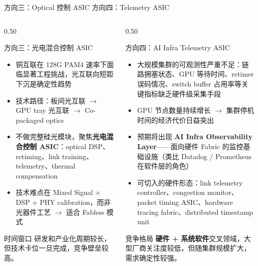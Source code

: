 \documentclass[aspectratio=169, 8pt, UTF8]{ctexbeamer}
\begin{document}
\begin{frame}{方向三：Optical 控制 ASIC \quad 方向四：Telemetry ASIC}
  \begin{columns}[T]
    \begin{column}{0.50\textwidth}
      \begin{block}{方向三：光电混合控制 ASIC}
        \begin{itemize}
          \item 铜互联在 128G PAM4 速率下面临显著工程挑战，光互联向短距下沉是确定性趋势
          \item 技术路径：板间光互联 $\to$ GPU tray 光互联 $\to$ Co-packaged optics
          \item 不做完整硅光模块，聚焦\textbf{光电混合控制 ASIC}：optical DSP、retiming、link training、telemetry、thermal compensation
          \item 技术难点在 Mixed Signal + DSP + PHY calibration，而非光器件工艺 $\to$ 适合 Fabless 模式
        \end{itemize}
      \end{block}
      \begin{alertblock}{时间窗口}
        研发和产业化周期较长，但技术卡位一旦完成，竞争壁垒较高。
      \end{alertblock}
    \end{column}
    \begin{column}{0.50\textwidth}
      \begin{block}{方向四：AI Infra Telemetry ASIC}
        \begin{itemize}
          \item 大规模集群的可观测性严重不足：链路拥塞状态、GPU 等待时间、retimer 误码情况、switch buffer 占用率等关键指标缺乏硬件级采集手段
          \item GPU 节点数量持续增长 $\to$ 集群停机时间的经济代价日益突出
          \item 预期将出现 \textbf{AI Infra Observability Layer}——面向硬件 Fabric 的监控基础设施（类比 Datadog / Prometheus 在软件层的角色）
          \item 可切入的硬件形态：link telemetry controller、congestion monitor、packet timing ASIC、hardware tracing fabric、distributed timestamp unit
        \end{itemize}
      \end{block}
      \begin{exampleblock}{竞争格局}
        \textbf{硬件 + 系统软件}交叉领域，大型厂商关注度较低，但随集群规模扩大，需求确定性较强。
      \end{exampleblock}
    \end{column}
  \end{columns}
\end{frame}
\end{document}
